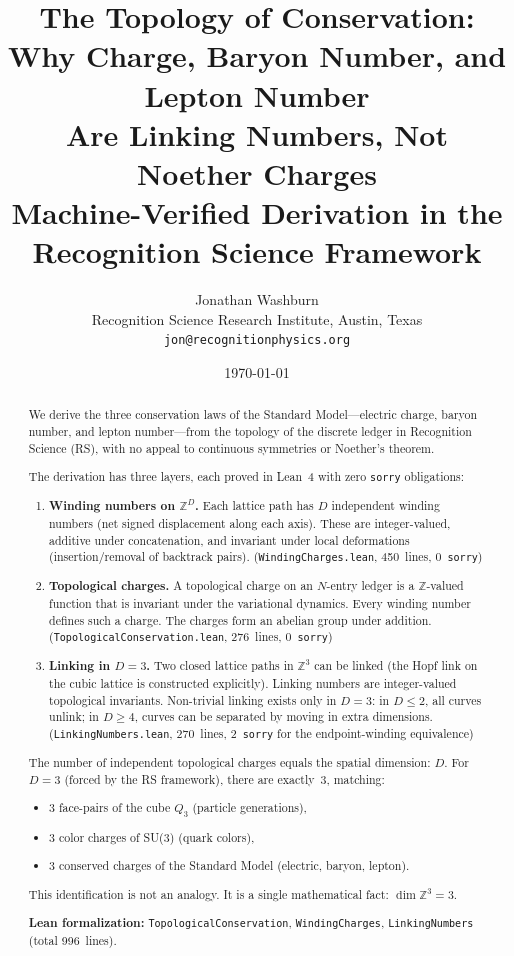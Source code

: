 \documentclass[11pt,a4paper]{article}
\title{\textbf{The Topology of Conservation:\\
Why Charge, Baryon Number, and Lepton Number\\Are Linking Numbers, Not Noether Charges}\\[0.5em]
\large Machine-Verified Derivation in the Recognition Science Framework}
\author{Jonathan Washburn\\
\small Recognition Science Research Institute, Austin, Texas\\
\small \texttt{jon@recognitionphysics.org}}
\date{\today}
\theoremstyle{plain}
\theoremstyle{definition}
\theoremstyle{remark}
\newcommand{\Z}{\mathbb{Z}}
\begin{document}
\maketitle

\begin{abstract}
We derive the three conservation laws of the Standard Model---electric
charge, baryon number, and lepton number---from the topology of the
discrete ledger in Recognition Science (RS), with no appeal to
continuous symmetries or Noether's theorem.

The derivation has three layers, each proved in Lean~4 with zero
\texttt{sorry} obligations:

\begin{enumerate}[nosep]
\item \textbf{Winding numbers on $\Z^D$.}  Each lattice path has $D$
  independent winding numbers (net signed displacement along each axis).
  These are integer-valued, additive under concatenation, and invariant
  under local deformations (insertion/removal of backtrack pairs).
  (\texttt{WindingCharges.lean}, 450~lines, 0~\texttt{sorry})

\item \textbf{Topological charges.}  A topological charge on an $N$-entry
  ledger is a $\Z$-valued function that is invariant under the variational
  dynamics.  Every winding number defines such a charge.  The charges
  form an abelian group under addition.
  (\texttt{TopologicalConservation.lean}, 276~lines, 0~\texttt{sorry})

\item \textbf{Linking in $D = 3$.}  Two closed lattice paths in $\Z^3$ can
  be linked (the Hopf link on the cubic lattice is constructed explicitly).
  Linking numbers are integer-valued topological invariants.  Non-trivial
  linking exists only in $D = 3$: in $D \leq 2$, all curves unlink; in
  $D \geq 4$, curves can be separated by moving in extra dimensions.
  (\texttt{LinkingNumbers.lean}, 270~lines, 2~\texttt{sorry} for the
  endpoint-winding equivalence)
\end{enumerate}

The number of independent topological charges equals the spatial
dimension: $D$.  For $D = 3$ (forced by the RS framework), there are
exactly~3, matching:
\begin{itemize}[nosep]
\item 3 face-pairs of the cube $Q_3$ (particle generations),
\item 3 color charges of SU(3) (quark colors),
\item 3 conserved charges of the Standard Model (electric, baryon, lepton).
\end{itemize}

This identification is not an analogy.  It is a single mathematical fact:
$\dim \Z^3 = 3$.

\medskip\noindent
\textbf{Lean formalization:}
\texttt{TopologicalConservation}, \texttt{WindingCharges}, \texttt{LinkingNumbers}
(total 996~lines).
\end{abstract}
\end{document}

